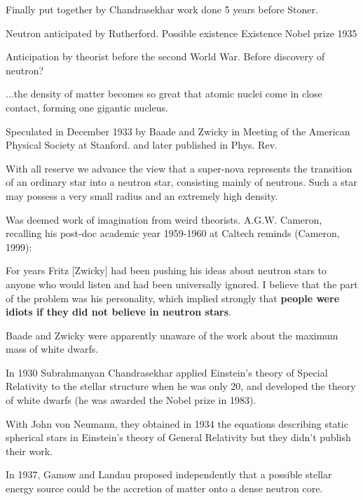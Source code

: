 Finally put together by Chandrasekhar \cite{Cha31} work done 5 years before Stoner.

Neutron anticipated by Rutherford.\cite{Rutherford20}
Possible existence\cite{Chadwick32a}
Existence\cite{Chadwick32b}
Nobel prize 1935

Anticipation by theorist before the second World War. \cite{Landau32}
Before discovery of neutron?
\begin{displayquote}[Landau]
...the density of matter becomes so great that atomic nuclei come in close contact, forming one gigantic nucleus.
\end{displayquote}

Speculated in December 1933 by Baade and Zwicky in Meeting of the American Physical Society at Stanford.\cite{Baade34a}
and later published in Phys. Rev. \cite{Baade34aa}
\begin{displayquote}
With all reserve we advance the view that a super-nova represents the transition of an ordinary star into a neutron star, consisting mainly of neutrons. Such a star may possess a very small radius and an extremely high density.
\end{displayquote}

Was deemed work of imagination from weird theorists.
A.G.W. Cameron, recalling his post-doc academic year 1959-1960 at Caltech reminds (Cameron, 1999): 
\begin{displayquote}
For years Fritz [Zwicky] had been pushing his ideas about neutron stars to anyone who would listen and had been universally ignored. 
I believe that the part of the problem was his personality, which implied strongly that \textbf{people were idiots if they did not believe in neutron stars}.
\end{displayquote}
Baade and Zwicky were apparently unaware of the work about the maximum mass of white dwarfs. 


In 1930 Subrahmanyan Chandrasekhar applied Einstein’s theory of Special Relativity to the stellar structure when he was only 20, and developed the theory of white dwarfs (he was awarded the Nobel prize in 1983).

With John von Neumann, they obtained in 1934 the equations describing static spherical stars in Einstein’s theory of General Relativity but they didn’t publish their work.\cite{Baym82}

In 1937, Gamow and Landau proposed independently that a possible stellar energy source could be the accretion of matter onto a dense neutron core.

